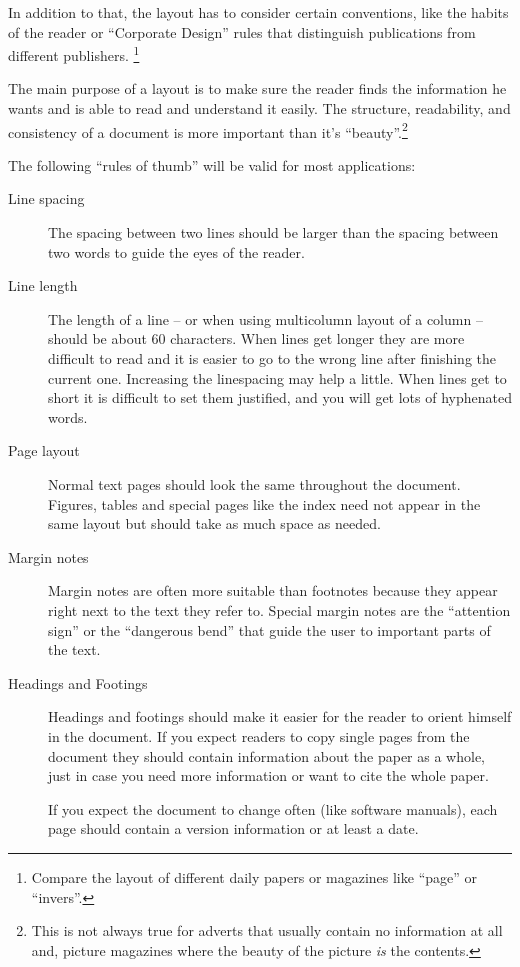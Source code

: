 \documentclass[twoside,a4paper]{refart}
\begin{document}
In addition to that, the layout has to consider certain conventions, 
like the habits of the reader or ``Corporate Design''  rules that distinguish publications from different publishers.  
\footnote{Compare the layout of different daily papers or magazines 
like ``page'' or ``invers''.}

\attention
The main purpose of a layout is to make sure the reader finds the 
information he wants and is able to read and understand it easily.
The structure, readability, and consistency of a document is more 
important than it's ``beauty''.\footnote{This is not always true for 
adverts that usually contain no information at all and, picture 
magazines where the beauty of the picture \emph{is} the contents.}

The following ``rules of thumb'' will be valid 
for most applications:

\begin{description}

\item[Line spacing]
        The spacing between two lines should be larger than the spacing 
        between two words to guide the eyes of the reader.

\item[Line length]
        The length of a line -- or when using multicolumn layout of a 
        column -- should be about 60 characters. When lines get longer they 
        are more difficult to read and it is easier to go to the wrong line 
        after finishing the current one. Increasing the linespacing may help a 
        little.
        When lines get to short it is difficult to set them justified, and you 
        will get lots of hyphenated words.
        
\item[Page layout]
        Normal text pages should look the same throughout the document. 
        Figures, tables and special pages like the index need not appear in 
        the same layout but should take as much space as needed.
        
\item[Margin notes]
        Margin notes are often more suitable than footnotes because they 
        appear right next to the text they refer to. Special margin notes are 
        the ``attention sign'' or the ``dangerous bend'' that guide the user 
        to important parts of the text.
        
\item[Headings and Footings]
        Headings and footings should make it easier for the reader to orient
        himself in the document. If you expect readers to copy single pages
        from the document they should contain information about the paper as
        a whole, just in case you need more information or want to cite the
        whole paper.
        
        If you expect the document to change often (like software manuals),
        each page should contain a version information or at least a date.
        
\end{description}
\end{document}
